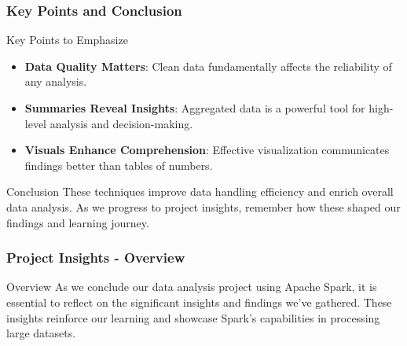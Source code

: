 \documentclass[aspectratio=169]{beamer}
\begin{document}
\begin{frame}[fragile]
    \frametitle{Key Points and Conclusion}
    \begin{block}{Key Points to Emphasize}
        \begin{itemize}
            \item \textbf{Data Quality Matters}: Clean data fundamentally affects the reliability of any analysis.
            \item \textbf{Summaries Reveal Insights}: Aggregated data is a powerful tool for high-level analysis and decision-making.
            \item \textbf{Visuals Enhance Comprehension}: Effective visualization communicates findings better than tables of numbers.
        \end{itemize}
    \end{block}
    
    \begin{block}{Conclusion}
        These techniques improve data handling efficiency and enrich overall data analysis. As we progress to project insights, remember how these shaped our findings and learning journey.
    \end{block}
\end{frame}

\begin{frame}[fragile]
    \frametitle{Project Insights - Overview}
    \begin{block}{Overview}
        As we conclude our data analysis project using Apache Spark, it is essential to reflect on the significant insights and findings we've gathered. 
        These insights reinforce our learning and showcase Spark's capabilities in processing large datasets.
    \end{block}
\end{frame}
\end{document}
